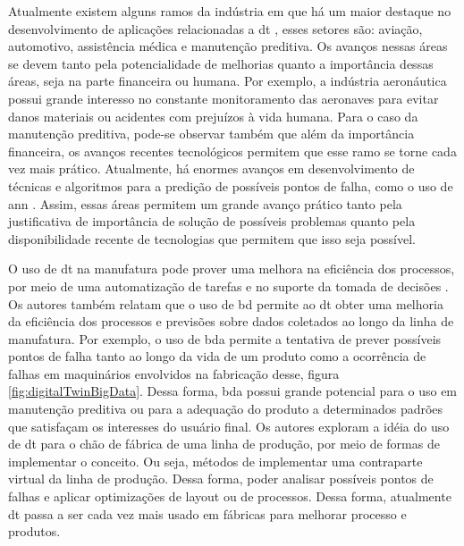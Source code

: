 Atualmente existem alguns ramos da indústria em que há um maior destaque no desenvolvimento de aplicações relacionadas a \acrshort{dt} , esses setores são: aviação, automotivo, assistência médica e manutenção preditiva. Os avanços nessas áreas se devem tanto pela potencialidade de melhorias quanto a importância dessas áreas, seja na parte financeira ou humana. Por exemplo, a indústria aeronáutica possui grande interesso no constante monitoramento das aeronaves para evitar danos materiais ou acidentes com prejuízos à vida humana. Para o caso da manutenção preditiva, pode-se observar também que além da importância financeira, os avanços recentes tecnológicos permitem que esse ramo se torne cada vez mais prático. Atualmente, há enormes avanços em desenvolvimento de técnicas e algoritmos para a predição de possíveis pontos de falha, como o uso de \acrfull{ann} \cite{He2019PreliminaryEO}. Assim, essas áreas permitem um grande avanço prático tanto pela justificativa de importância de solução de possíveis problemas quanto pela disponibilidade recente de tecnologias que permitem que isso seja possível. 

O uso de \acrshort{dt} na manufatura pode prover uma melhora na eficiência dos processos, por meio de uma automatização de tarefas e no suporte da tomada de decisões \cite{ROSEN2015567}.
Os autores \textcite{Qi2018} também relatam que o uso de \acrfull{bd} permite ao \acrshort{dt} obter uma melhoria da eficiência dos processos e previsões sobre dados coletados ao longo da linha de manufatura. Por exemplo, o uso de \acrshort{bda} permite a tentativa de prever possíveis pontos de falha tanto ao longo da vida de um produto como a ocorrência de falhas em maquinários envolvidos na fabricação desse, figura \ref{fig:digitalTwinBigData}. Dessa forma, \acrshort{bda} possui grande potencial para o uso em manutenção preditiva ou para a adequação do produto a determinados padrões que satisfaçam os interesses do usuário final.  Os autores \textcite{Tao2017} exploram a idéia do uso de \acrshort{dt} para o chão de fábrica de uma linha de produção, por meio de formas de implementar o conceito. Ou seja, métodos de implementar  uma contraparte virtual da linha de produção. Dessa forma, poder analisar possíveis pontos de falhas e aplicar optimizações de layout ou de processos. Dessa forma, atualmente \acrshort{dt} passa a ser cada vez mais usado em fábricas para melhorar processo e produtos.

